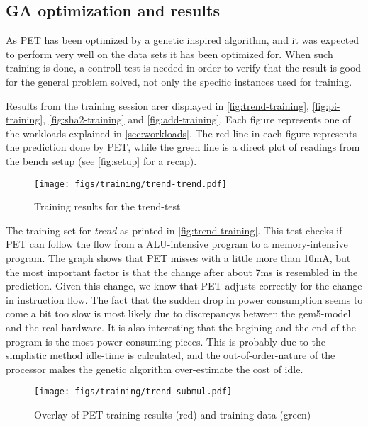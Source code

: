 \subsection{GA optimization and results}

As PET has been optimized by a genetic inspired algorithm, and it was expected
to perform very well on the data sets it has been optimized for. When such
training is done, a controll test is needed in order to verify that the result
is good for the general problem solved, not only the specific instances used for
training.


Results from the training session arer displayed in
\autoref{fig:trend-training}, \autoref{fig:pi-training},
\autoref{fig:sha2-training} and \autoref{fig:add-training}. Each figure
represents one of the workloads explained in \autoref{sec:workloads}.
The red line in each figure represents the prediction done by PET, while
the green line is a direct plot of readings from the bench setup (see \autoref{fig:setup} for a recap).

\begin{figure}[htb]
    \centering
    \texttt{[image: figs/training/trend-trend.pdf]}
    \caption{Training results for the trend-test}
    \label{fig:trend-training}
\end{figure}

The training set for \emph{trend} as printed in \autoref{fig:trend-training}.
This test checks if PET can follow the flow from a ALU-intensive program to a
memory-intensive program. The graph shows that PET misses with a little more
than 10mA, but the most important factor is that the change after about 7ms is
resembled in the prediction. Given this change, we know that PET adjusts
correctly for the change in instruction flow. The fact that the sudden drop in
power consumption seems to come a bit too slow is most likely due to
discrepancys between the gem5-model and the real hardware. It is also
interesting that the begining and the end of the program is the most power
consuming pieces. This is probably due to the simplistic method idle-time is
calculated, and the out-of-order-nature of the processor makes the genetic
algorithm over-estimate the cost of idle.

\begin{figure}[htb]
    \centering
    \texttt{[image: figs/training/trend-submul.pdf]}
    \caption{Overlay of PET training results (red) and training data (green)}
    \label{fig:submul-training}
\end{figure}

